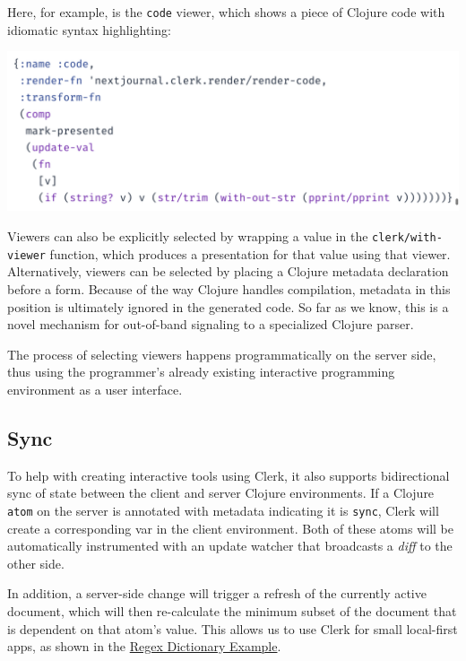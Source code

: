 \documentclass[sigconf,screen]{acmart}
\newcommand{\passthrough}[1]{#1}
\begin{document}
Here, for example, is the \passthrough{\lstinline!code!} viewer, which shows a piece of Clojure code with idiomatic syntax highlighting:

\includegraphics{images/anon-expr-5drCPuwp8LirNTWeyr5WSDHWVV2rnC-result.png}

Viewers can also be explicitly selected by wrapping a value in the \passthrough{\lstinline!clerk/with-viewer!} function, which produces a presentation for that value using that viewer. Alternatively, viewers can be selected by placing a Clojure metadata declaration before a form. Because of the way Clojure handles compilation, metadata in this position is ultimately ignored in the generated code. So far as we know, this is a novel mechanism for out-of-band signaling to a specialized Clojure parser.

The process of selecting viewers happens programmatically on the server side, thus using the programmer's already existing interactive programming environment as a user interface.

\hypertarget{id}{%
\subsection{Sync}\label{id}}

To help with creating interactive tools using Clerk, it also supports bidirectional sync of state between the client and server Clojure environments. If a Clojure \passthrough{\lstinline!atom!} on the server is annotated with metadata indicating it is \passthrough{\lstinline!sync!}, Clerk will create a corresponding var in the client environment. Both of these atoms will be automatically instrumented with an update watcher that broadcasts a \emph{diff} to the other side.

In addition, a server-side change will trigger a refresh of the currently active document, which will then re-calculate the minimum subset of the document that is dependent on that atom's value. This allows us to use Clerk for small local-first apps, as shown in the \protect\hyperlink{regex-dictionary}{Regex Dictionary Example}.
\end{document}
